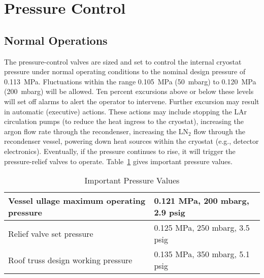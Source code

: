 
\section{Pressure Control}
\label{sec:press-control}

\subsection{Normal Operations}

The pressure-control valves are sized and set to control the internal cryostat pressure under normal operating conditions to the nominal design pressure of 0.113~MPa.  Fluctuations within the range 0.105~MPa (50~mbarg) to 0.120~MPa (200~mbarg) will be allowed.
Ten percent excursions above or below these levels will set off alarms to alert the operator to 
intervene.  Further excursion may result in automatic (executive) actions.  These actions may 
include stopping the LAr circulation pumps (to reduce the heat ingress to the cryostat), increasing the 
argon flow rate through the recondenser, increasing the LN$_2$ flow through the recondenser vessel, 
powering down heat sources within the cryostat (e.g., detector electronics).  Eventually, if the pressure continues to rise, it will trigger the pressure-relief valves to operate. Table~\ref{table:pressure-values} gives important pressure values.

\begin{table}
\centering
\caption{Important Pressure Values}
\label{table:pressure-values}\begin{tabular}[htbp]{|l|l|}
\hline 
Vessel ullage maximum operating pressure & 0.121 MPa, 200 mbarg, 2.9 psig\\
\hline
Relief valve set pressure& 0.125 MPa, 250 mbarg, 3.5 psig\\
\hline
Roof truss design working pressure& 0.135 MPa, 350 mbarg, 5.1 psig\\
\hline
\end{tabular} 

\end{table}

